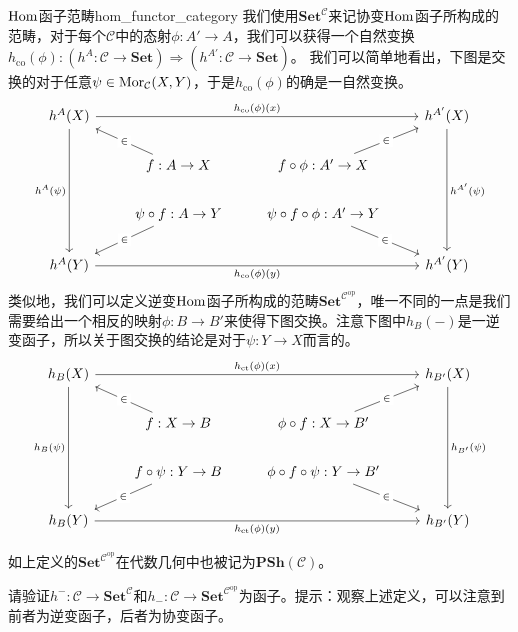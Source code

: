 \documentclass[../main.tex]{subfiles}
\begin{document}
\begin{definition}{$\operatorname{Hom}$函子范畴}{hom_functor_category}
我们使用$\mathbf{Set}^\mathcal{C}$来记协变$\operatorname{Hom}$函子所构成的范畴，对于每个$\mathcal{C}$中的态射$\phi:A'\to A$，我们可以获得一个自然变换$h_{\text{co}}(\phi):(h^A:\mathcal{C}\to\mathbf{Set})\Rightarrow(h^{A'}:\mathcal{C}\to\mathbf{Set})$。
我们可以简单地看出，下图是交换的对于任意$\psi\in\operatorname{Mor}_\mathcal{C}(X,Y)$，于是$h_\text{co}(\phi)$的确是一自然变换。
$$
\begin{tikzcd}
h^A(X) \arrow[rrr, "h_{\text{co}}(\phi)(x)"]\arrow[ddd, "h^A(\psi)"'] & {} & {} & h^{A'}(X) \arrow[ddd, "h^{A'}(\psi)"] \\ {} & f:A\to X \arrow[lu, "\in" description] & f\circ\phi:A'\to X \arrow[ru, "\in" description]&{}\\{}& \psi\circ f:A\to Y \arrow[ld, "\in" description] & \psi\circ f\circ\phi:A'\to Y \arrow[rd, "\in" description] & {} \\ h^A(Y) \arrow[rrr, "h_{\text{co}}(\phi)(y)"'] & {} & {} & h^{A'}(Y)
\end{tikzcd}
$$
类似地，我们可以定义逆变$\operatorname{Hom}$函子所构成的范畴$\mathbf{Set}^{\mathcal{C}^\text{op}}$，唯一不同的一点是我们需要给出一个相反的映射$\phi:B\to B'$来使得下图交换。注意下图中$h_B(-)$是一逆变函子，所以关于图交换的结论是对于$\psi:Y\to X$而言的。
$$
\begin{tikzcd}
h_B(X) \arrow[rrr, "h_{\text{ct}}(\phi)(x)"]\arrow[ddd, "h_B(\psi)"'] & {} & {} & h_{B'}(X) \arrow[ddd, "h_{B'}(\psi)"] \\ {} & f:X\to B \arrow[lu, "\in" description] & \phi\circ f:X\to B' \arrow[ru, "\in" description]& {} \\ {} & f\circ\psi:Y\to B \arrow[ld, "\in" description] & \phi\circ f\circ\psi:Y\to B' \arrow[rd, "\in" description] & {} \\ h_B(Y) \arrow[rrr, "h_{\text{ct}}(\phi)(y)"'] & {} & {} & h_{B'}(Y)
\end{tikzcd}
$$
\end{definition}
如上定义的$\mathbf{Set}^{\mathcal{C}^\text{op}}$在代数几何中也被记为$\mathbf{PSh}(\mathcal{C})$。
\begin{exercise}
请验证$h^{-}:\mathcal{C}\to\mathbf{Set}^\mathcal{C}$和$h_{-}:\mathcal{C}\to\mathbf{Set}^{\mathcal{C}^\text{op}}$为函子。提示：观察上述定义，可以注意到前者为逆变函子，后者为协变函子。
\end{exercise}
\end{document}
